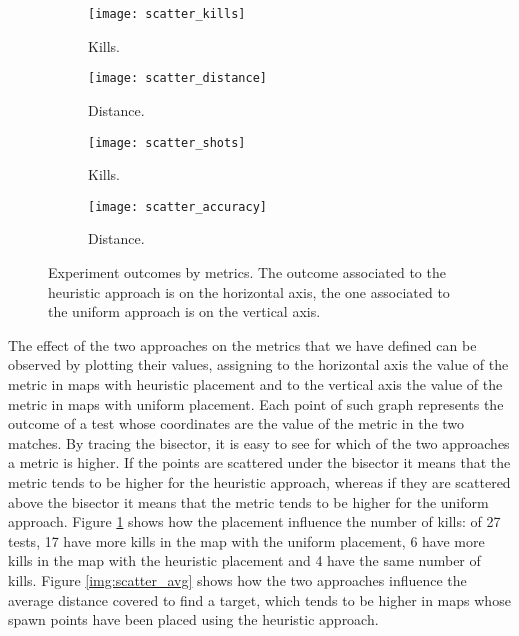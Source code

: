 \begin{figure}
\centering
\begin{subfigure}[t]{0.49\linewidth}
\texttt{[image: scatter\_kills]}
\caption{Kills.}
\label{img:scatter_kills}
\end{subfigure}
\hfill
\begin{subfigure}[t]{0.49\linewidth}
\texttt{[image: scatter\_distance]}
\caption{Distance.}
\label{img:scatter_distance}
\end{subfigure}

\begin{subfigure}[t]{0.49\linewidth}
\texttt{[image: scatter\_shots]}
\caption{Kills.}
\label{img:scatter_shots}
\end{subfigure}
\hfill
\begin{subfigure}[t]{0.49\linewidth}
\texttt{[image: scatter\_accuracy]}
\caption{Distance.}
\label{img:scatter_accuracy}
\end{subfigure}
\caption[Experiment outcomes by metrics.]{Experiment outcomes by metrics. The outcome associated to the heuristic approach is on the horizontal axis, the one associated to the uniform approach is on the vertical axis.}
\label{img:metrics} 
\end{figure}

The effect of the two approaches on the metrics that we have defined can be observed by plotting their values, assigning to the horizontal axis the value of the metric in maps with heuristic placement and to the vertical axis the value of the metric in maps with uniform placement. Each point of such graph represents the outcome of a test whose coordinates are the value of the metric in the two matches. By tracing the bisector, it is easy to see for which of the two approaches a metric is higher. If the points are scattered under the bisector it means that the metric tends to be higher for the heuristic approach, whereas if they are scattered above the bisector it means that the metric tends to be higher for the uniform approach. Figure \ref{img:scatter_kills} shows how the placement influence the number of kills: of 27 tests, 17 have more kills in the map with the uniform placement, 6 have more kills in the map with the heuristic placement and 4 have the same number of kills. Figure \ref{img:scatter_avg} shows how the two approaches influence the average distance covered to find a target, which tends to be higher in maps whose spawn points have been placed using the heuristic approach.

